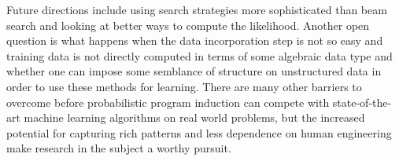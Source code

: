 \documentclass[a4paper,10pt]{article}
\begin{document}
Future directions include using search strategies more sophisticated than beam search and looking at better ways to compute the likelihood.  Another open question is what happens when the data incorporation step is not so easy and training data is not directly computed in terms of some algebraic data type and whether one can impose some semblance of structure on unstructured data in order to use these methods for learning.  There are many other barriers to overcome before probabilistic program induction can compete with state-of-the-art machine learning algorithms on real world problems, but the increased potential for capturing rich patterns and less dependence on human engineering make research in the subject a worthy pursuit.


\end{document}

